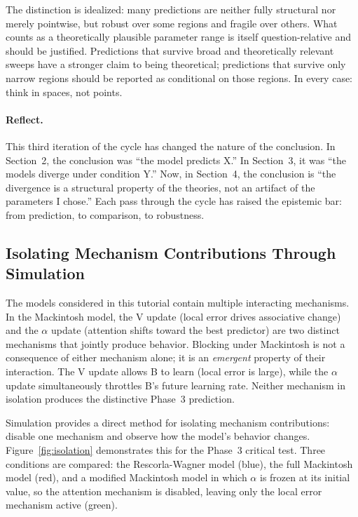 \documentclass[fleqn,10pt]{wlscirep}
\begin{document}
\begin{linenumbers}
The distinction is idealized: many predictions are neither fully structural nor merely pointwise, but robust over some regions and fragile over others. What counts as a theoretically plausible parameter range is itself question-relative and should be justified. Predictions that survive broad and theoretically relevant sweeps have a stronger claim to being theoretical; predictions that survive only narrow regions should be reported as conditional on those regions. In every case: think in spaces, not points.

\paragraph{Reflect.} This third iteration of the cycle has changed the nature of the conclusion. In Section~2, the conclusion was ``the model predicts X.'' In Section~3, it was ``the models diverge under condition Y.'' Now, in Section~4, the conclusion is ``the divergence is a structural property of the theories, not an artifact of the parameters I chose.'' Each pass through the cycle has raised the epistemic bar: from prediction, to comparison, to robustness.

\subsection{Isolating Mechanism Contributions Through Simulation}

The models considered in this tutorial contain multiple interacting mechanisms. In the Mackintosh model, the V update (local error drives associative change) and the $\alpha$ update (attention shifts toward the best predictor) are two distinct mechanisms that jointly produce behavior. Blocking under Mackintosh is not a consequence of either mechanism alone; it is an \emph{emergent} property of their interaction. The V update allows B to learn (local error is large), while the $\alpha$ update simultaneously throttles B's future learning rate. Neither mechanism in isolation produces the distinctive Phase~3 prediction.

Simulation provides a direct method for isolating mechanism contributions: disable one mechanism and observe how the model's behavior changes. Figure~\ref{fig:isolation} demonstrates this for the Phase~3 critical test. Three conditions are compared: the Rescorla-Wagner model (blue), the full Mackintosh model (red), and a modified Mackintosh model in which $\alpha$ is frozen at its initial value, so the attention mechanism is disabled, leaving only the local error mechanism active (green).


\end{linenumbers}
\end{document}
